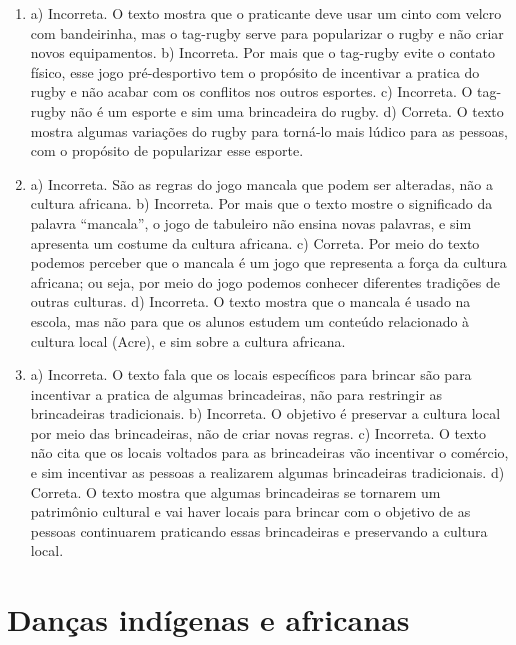 
\begin{enumerate}

\item
a) Incorreta. O texto mostra que o praticante deve usar um cinto com
velcro com bandeirinha, mas o tag-rugby serve para popularizar o rugby e
não criar novos equipamentos.
b) Incorreta. Por mais que o tag-rugby evite o contato físico, esse jogo
pré-desportivo tem o propósito de incentivar a pratica do rugby e não
acabar com os conflitos nos outros esportes.
c) Incorreta. O tag-rugby não é um esporte e sim uma brincadeira do
rugby.
d) Correta. O texto mostra algumas variações do rugby para torná-lo mais
lúdico para as pessoas, com o propósito de popularizar esse esporte.

\item
a) Incorreta. São as regras do jogo mancala que podem ser
alteradas, não a cultura africana.
b) Incorreta. Por mais que o texto mostre o significado da palavra
“mancala”, o jogo de tabuleiro não ensina novas palavras, e sim
apresenta um costume da cultura africana.
c) Correta. Por meio do texto podemos perceber que o mancala é um jogo
que representa a força da cultura africana; ou seja, por meio do jogo podemos conhecer diferentes tradições de outras culturas.
d) Incorreta. O texto mostra que o mancala é usado na escola, mas não
para que os alunos estudem um conteúdo relacionado à cultura local
(Acre), e sim sobre a cultura africana.

\item
a) Incorreta. O texto fala que os locais específicos para brincar são para
incentivar a pratica de algumas brincadeiras, não para restringir as
brincadeiras tradicionais.
b) Incorreta. O objetivo é preservar a cultura local por meio das
brincadeiras, não de criar novas regras.
c) Incorreta. O texto não cita que os locais voltados para as
brincadeiras vão incentivar o comércio, e sim incentivar as pessoas a
realizarem algumas brincadeiras tradicionais.
d) Correta. O texto mostra que algumas brincadeiras se tornarem um
patrimônio cultural e vai haver locais para brincar com o objetivo de
as pessoas continuarem praticando essas brincadeiras e preservando a cultura
local.
\end{enumerate}

\chapter{Danças indígenas e africanas}

